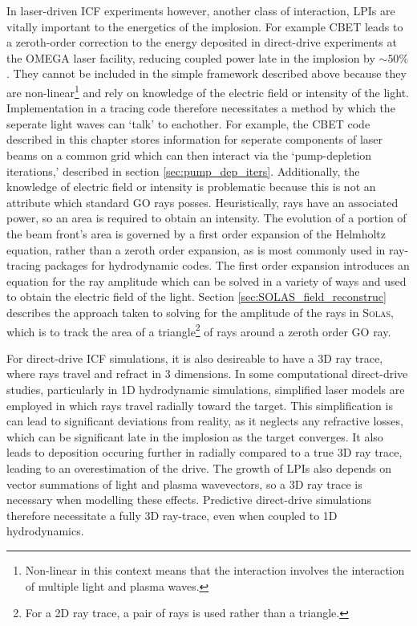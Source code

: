 In laser-driven \ac{ICF} experiments however, another class of interaction, \ac{LPIs} are vitally important to the energetics of the implosion.
For example \ac{CBET} leads to a zeroth-order correction to the energy deposited in direct-drive experiments at the OMEGA laser facility, reducing coupled power late in the implosion by $\sim 50\%$.
They cannot be included in the simple framework described above because they are non-linear\footnote{Non-linear in this context means that the interaction involves the interaction of multiple light and plasma waves.} and rely on knowledge of the electric field or intensity of the light.
Implementation in a tracing code therefore necessitates a method by which the seperate light waves can `talk' to eachother.
For example, the \ac{CBET} code described in this chapter stores information for seperate components of laser beams on a common grid which can then interact via the `pump-depletion iterations,' described in section \ref{sec:pump_dep_iters}.
Additionally, the knowledge of electric field or intensity is problematic because this is not an attribute which standard \ac{GO} rays posses.
Heuristically, rays have an associated power, so an area is required to obtain an intensity.
The evolution of a portion of the beam front's area is governed by a first order expansion of the Helmholtz equation, rather than a zeroth order expansion, as is most commonly used in ray-tracing packages for hydrodynamic codes.
The first order expansion introduces an equation for the ray amplitude which can be solved in a variety of ways and used to obtain the electric field of the light.
Section \ref{sec:SOLAS_field_reconstruc} describes the approach taken to solving for the amplitude of the rays in \textsc{Solas}, which is to track the area of a triangle\footnote{For a 2D ray trace, a pair of rays is used rather than a triangle.} of rays around a zeroth order \ac{GO} ray.

For direct-drive \ac{ICF} simulations, it is also desireable to have a 3D ray trace, where rays travel and refract in 3 dimensions.
In some computational direct-drive studies, particularly in 1D hydrodynamic simulations, simplified laser models are employed in which rays travel radially toward the target.
This simplification is can lead to significant deviations from reality, as it neglects any refractive losses, which can be significant late in the implosion as the target converges.
It also leads to deposition occuring further in radially compared to a true 3D ray trace, leading to an overestimation of the drive.
The growth of \ac{LPIs} also depends on vector summations of light and plasma wavevectors, so a 3D ray trace is necessary when modelling these effects.
Predictive direct-drive simulations therefore necessitate a fully 3D ray-trace, even when coupled to 1D hydrodynamics.



